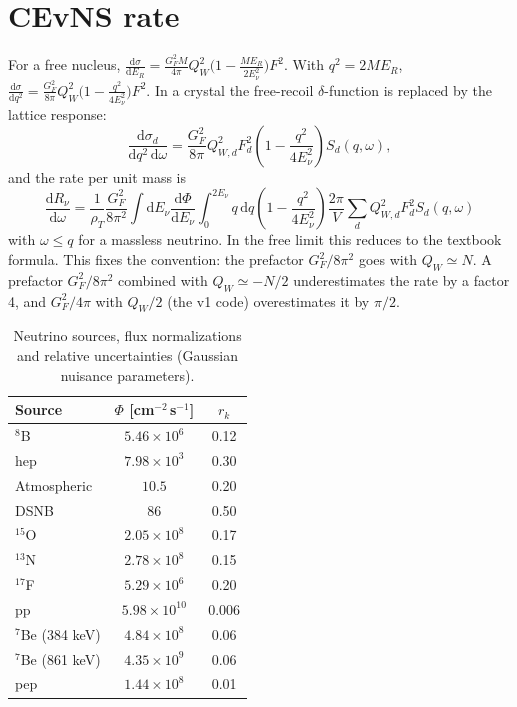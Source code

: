 \documentclass[11pt,a4paper]{article}
\numberwithin{equation}{section}
\newcommand{\dd}{\mathrm{d}}
\begin{document}
\section{CEvNS rate}
For a free nucleus,
$\frac{\dd\sigma}{\dd E_R}=\frac{G_F^2M}{4\pi}Q_W^2\big(1-\frac{ME_R}{2E_\nu^2}\big)F^2$.
With $q^2=2ME_R$,
$\frac{\dd\sigma}{\dd q^2}=\frac{G_F^2}{8\pi}Q_W^2\big(1-\frac{q^2}{4E_\nu^2}\big)F^2$.
In a crystal the free-recoil $\delta$-function is replaced by the lattice response:
\begin{equation}
  \frac{\dd\sigma_d}{\dd q^2\,\dd\omega}=\frac{G_F^2}{8\pi}Q_{W,d}^2F_d^2
  \left(1-\frac{q^2}{4E_\nu^2}\right)S_d(q,\omega),
\end{equation}
and the rate per unit mass is
\begin{equation}
  \boxed{\;\frac{\dd R_\nu}{\dd\omega}=\frac{1}{\rho_T}\frac{G_F^2}{8\pi^2}
  \int\dd E_\nu\frac{\dd\Phi}{\dd E_\nu}\int_0^{2E_\nu}q\,\dd q\left(1-\frac{q^2}{4E_\nu^2}\right)
  \frac{2\pi}{V}\sum_dQ_{W,d}^2F_d^2S_d(q,\omega)\;}
\end{equation}
with $\omega\le q$ for a massless neutrino. In the free limit this reduces to the textbook
formula. This fixes the convention: the prefactor $G_F^2/8\pi^2$ goes with
$Q_W\simeq N$. A prefactor $G_F^2/8\pi^2$ combined with $Q_W\simeq-N/2$ underestimates the
rate by a factor 4, and $G_F^2/4\pi$ with $Q_W/2$ (the v1 code) overestimates it by $\pi/2$.

\begin{table}[h]
\centering\small
\caption{Neutrino sources, flux normalizations and relative uncertainties (Gaussian
nuisance parameters).}
\label{tab:sources}
\begin{tabular}{lcc}
\toprule
Source & $\Phi$ [cm$^{-2}$\,s$^{-1}$] & $r_k$\\
\midrule
$^8$B & $5.46\times10^{6}$ & 0.12\\
hep & $7.98\times10^{3}$ & 0.30\\
Atmospheric & $10.5$ & 0.20\\
DSNB & $86$ & 0.50\\
$^{15}$O & $2.05\times10^{8}$ & 0.17\\
$^{13}$N & $2.78\times10^{8}$ & 0.15\\
$^{17}$F & $5.29\times10^{6}$ & 0.20\\
pp & $5.98\times10^{10}$ & 0.006\\
$^7$Be (384 keV) & $4.84\times10^{8}$ & 0.06\\
$^7$Be (861 keV) & $4.35\times10^{9}$ & 0.06\\
pep & $1.44\times10^{8}$ & 0.01\\
\bottomrule
\end{tabular}
\end{table}
\end{document}
